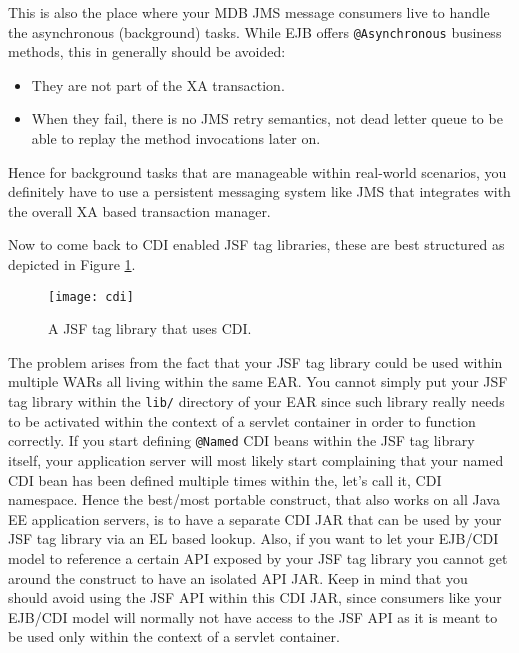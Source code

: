 This is also the place where your MDB JMS message consumers live to handle the asynchronous (background) tasks.
While EJB offers \texttt{@Asynchronous}  business methods, this in generally should be avoided:
\begin{itemize}
	\item They are not part of the XA transaction.
	\item When they fail, there is no JMS retry semantics, not dead letter queue to be able to replay the method invocations later on.
\end{itemize}
Hence for background tasks that are manageable within real-world scenarios, you definitely have to use a persistent messaging system like JMS that integrates with the overall XA based transaction manager.

Now to come back to CDI enabled JSF tag libraries, these are best structured as depicted in Figure \ref{fig:cdi}.
\begin{figure}[htbp]
	\begin{center}
		\texttt{[image: cdi]}
		\caption{A JSF tag library that uses CDI.}
		\label{fig:cdi}
	\end{center}
\end{figure}
The problem arises from the fact that your JSF tag library could be used within multiple WARs all living within the same EAR.
You cannot simply put your JSF tag library within the \texttt{lib/} directory of your EAR since such library really needs to be activated within the context of a servlet container in order to function correctly.
If you start defining \texttt{@Named} CDI beans within the JSF tag library itself, your application server will most likely start complaining that your named CDI bean has been defined multiple times within the, let's call it, CDI namespace.
Hence the best/most portable construct, that also works on all Java EE application servers, is to have a separate CDI JAR that can be used by your JSF tag library via an EL based lookup.
Also, if you want to let your EJB/CDI model to reference a certain API exposed by your JSF tag library you cannot get around the construct to have an isolated API JAR.
Keep in mind that you should avoid using the JSF API within this CDI JAR, since consumers like your EJB/CDI model will normally not have access to the JSF API as it is meant to be used only within the context of a servlet container.

